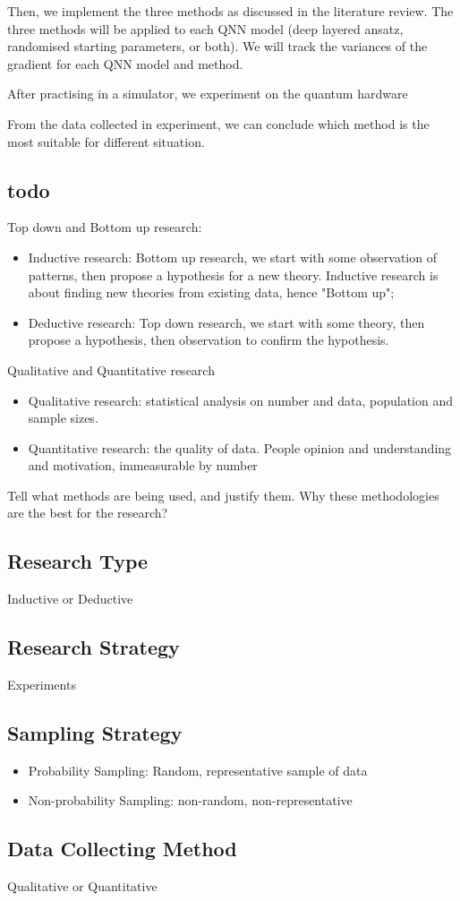
Then, we implement the three methods as discussed in the literature review.
The three methods will be applied to each QNN model (deep layered ansatz, randomised starting parameters, or both).
We will track the variances of the gradient for each QNN model and method.

After practising in a simulator, we experiment on the quantum hardware

From the data collected in experiment, we can conclude which method is the most suitable for different situation.

\subsection{todo}
Top down and Bottom up research:
\begin{itemize}
    \item Inductive research: Bottom up research, we start with some observation of patterns, then propose a hypothesis for a new theory. Inductive research is about finding new theories from existing data, hence "Bottom up";
    \item Deductive research: Top down research, we start with some theory, then propose a hypothesis, then observation to confirm the hypothesis.
\end{itemize}

Qualitative and Quantitative research
\begin{itemize}
    \item Qualitative research: statistical analysis on number and data, population and sample sizes.
    \item Quantitative research: the quality of data. People opinion and understanding and motivation, immeasurable by number
\end{itemize}

Tell what methods are being used, and justify them.
Why these methodologies are the best for the research?

\subsection{Research Type}
Inductive or Deductive

\subsection{Research Strategy}
Experiments

\subsection{Sampling Strategy}
\begin{itemize}
    \item Probability Sampling: Random, representative sample of data
    \item Non-probability Sampling: non-random, non-representative
\end{itemize}

\subsection{Data Collecting Method}
Qualitative or Quantitative